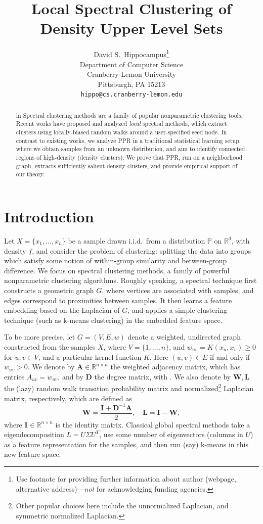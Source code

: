 \documentclass{article}
\title{Local Spectral Clustering of Density Upper Level Sets}
\author{%
  David S.~Hippocampus\thanks{Use footnote for providing further information
    about author (webpage, alternative address)---\emph{not} for acknowledging
    funding agencies.} \\
  Department of Computer Science\\
  Cranberry-Lemon University\\
  Pittsburgh, PA 15213 \\
  \texttt{hippo@cs.cranberry-lemon.edu} \\
}
\newcommand{\Reals}{\mathbb{R}}
\newcommand{\Rd}{\Reals^d}
\newcommand{\1}{\mathbf{1}}
\newcommand{\Abf}{\mathbf{A}}
\newcommand{\Xbf}{X}             %
\newcommand{\Wbf}{\mathbf{W}}
\newcommand{\Lbf}{\mathbf{L}}
\newcommand{\Dbf}{\mathbf{D}}
\newcommand{\Ibf}[1]{\mathbf{I}_{#1}}
\newcommand{\Pbb}{\mathbb{P}}
\theoremstyle{aldenthm}
\theoremstyle{aldenrmrk}
\begin{document}
\maketitle

\begin{abstract}
 in
  Spectral clustering methods are a family of popular nonparametric clustering
  tools.  Recent works have proposed and analyzed \emph{local} spectral methods,
  which extract clusters using locally-biased random walks around a user-specified
  seed node.  In contrast to existing works, we analyze PPR in a traditional
  statistical learning setup, where we obtain samples from an unknown
  distribution, and aim to identify connected regions of high-density (density
  clusters).  We prove that PPR, run on a neighborhood graph, extracts
  sufficiently salient density clusters, and provide empirical support of our theory.
\end{abstract}

\section{Introduction}
\label{sec: introduction}

Let $\Xbf = \{x_1, \ldots, x_n\}$ be a sample drawn i.i.d.\ from a
distribution $\Pbb$ on $\Rd$, with density $f$, and consider the problem of 
clustering: splitting the data into groups which satisfy some notion of
within-group similarity and between-group difference.  We focus on spectral
clustering methods, a family of powerful nonparametric clustering algorithms.
Roughly speaking, a spectral technique first constructs a geometric graph $G$,
where vertices are associated with samples, and edges correspond to proximities
between samples. It then learns a feature embedding based on the Laplacian of
$G$, and applies a simple clustering technique (such as k-means clustering) in
the embedded feature space.

To be more precise, let $G=(V,E,w)$ denote a weighted, undirected graph  
constructed from the samples $\Xbf$, where $V=\{1,\ldots,n\}$, and $w_{uv}
= K(x_u,x_v) \geq 0$ for $u,v \in V$, and a particular kernel function $K$.
Here $(u,v) \in E$ if and only if $w_{uv} > 0$.  We denote by $\Abf \in
\Reals^{n \times n}$ the weighted adjacency matrix, which has entries
$A_{uv}=w_{uv}$, and by $\Dbf$ the degree matrix, with 
\smash{$\Dbf_{uu} = \sum_{v \in V} \Abf_{uv}$}.  We also denote by $\Wbf,\Lbf$
the (lazy) random walk transition probability matrix and normalized\footnote{Other
	popular choices here include the unnormalized Laplacian, and symmetric
	normalized Laplacian.} 
Laplacian matrix, respectively, which are defined as
$$
\Wbf = \frac{\Ibf{} + \Dbf^{-1}\Abf}{2}, \quad \Lbf = \Ibf{} - \Wbf,
$$
where $\Ibf{} \in \Reals^{n\times n}$ is the identity matrix.  Classical global
spectral methods take a eigendecomposition $L=U \Sigma U^T$, use some 
number of eigenvectors (columns in $U$) as a feature representation for the
samples, and then run (say) k-means in this new feature space.
\end{document}
